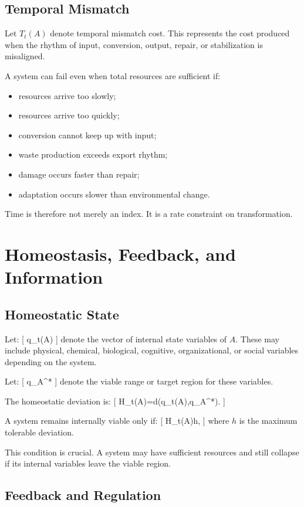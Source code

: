 \documentclass[11pt,a4paper]{article}
\begin{document}
\subsection{Temporal Mismatch}

Let $T_t(A)$ denote temporal mismatch cost. This represents the cost produced when the rhythm of input, conversion, output, repair, or stabilization is misaligned.

A system can fail even when total resources are sufficient if:
\begin{itemize}[leftmargin=2em]
\item resources arrive too slowly;
\item resources arrive too quickly;
\item conversion cannot keep up with input;
\item waste production exceeds export rhythm;
\item damage occurs faster than repair;
\item adaptation occurs slower than environmental change.
\end{itemize}

Time is therefore not merely an index. It is a rate constraint on transformation.

\section{Homeostasis, Feedback, and Information}

\subsection{Homeostatic State}

Let:
[
q_t(A)
]
denote the vector of internal state variables of $A$. These may include physical, chemical, biological, cognitive, organizational, or social variables depending on the system.

Let:
[
q_A^*
]
denote the viable range or target region for these variables.

The homeostatic deviation is:
[
H_t(A)=d(q_t(A),q_A^*).
]

A system remains internally viable only if:
[
H_t(A)\leq h,
]
where $h$ is the maximum tolerable deviation.

This condition is crucial. A system may have sufficient resources and still collapse if its internal variables leave the viable region.

\subsection{Feedback and Regulation}
\end{document}
